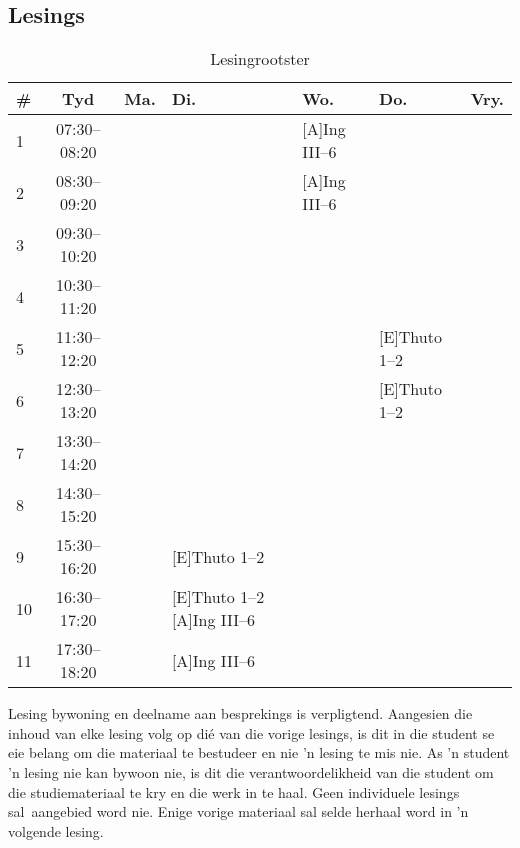     \subsection{Lesings}
        \begin{table}[!h]
            \begin{center}
             \begin{tabular}{|l|c|p{1.5cm}|p{2.4cm}|p{2.2cm}|p{2.4cm}|p{1.5cm}|}
                 \hline
                 {\bf \#} & {\bf Tyd} & {\bf Ma.} & {\bf Di.} & {\bf Wo.} &
                 {\bf Do.} & {\bf Vry.} \\
                 \hline
                 1  & 07:30--08:20 &  &  & [A]Ing III--6 &  & \\ \hline
                 2  & 08:30--09:20 &  &  & [A]Ing III--6 &  & \\ \hline
                 3  & 09:30--10:20 &  &  &  &  & \\ \hline
                 4  & 10:30--11:20 &  &  &  &  & \\ \hline
                 5  & 11:30--12:20 &  &  &  & [E]Thuto 1--2 & \\ \hline
                 6  & 12:30--13:20 &  &  &  & [E]Thuto 1--2 & \\ \hline
                 7  & 13:30--14:20 &  &  &  &  & \\ \hline
                 8  & 14:30--15:20 &  &  &  &  & \\ \hline
                 9  & 15:30--16:20 &  & [E]Thuto 1--2 &  &  & \\ \hline
                 10 & 16:30--17:20 &  & [E]Thuto 1--2 [A]Ing III--6 &  &  & \\ \hline
                 11 & 17:30--18:20 &  & [A]Ing III--6 &  &  & \\
                 \hline
             \end{tabular}
             \caption{Lesingrootster}
            \label{tab:lectures}
            \end{center}
        \end{table}
        
	Lesing bywoning en deelname aan besprekings is verpligtend.
    Aangesien die inhoud van elke lesing volg op di\'{e} van die vorige lesings,
    is dit in die student se eie belang om die materiaal te bestudeer 
    en nie 'n lesing te mis nie. As 'n student 'n  
    lesing nie kan bywoon nie, is dit die verantwoordelikheid 
    van die student om die studiemateriaal te kry en die werk in te haal. 
    Geen individuele lesings sal aangebied word nie. Enige vorige materiaal sal selde 
    herhaal word in 'n volgende lesing.
        
